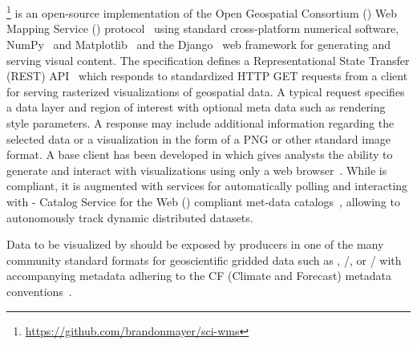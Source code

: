\section{\sciwms{}}
\label{sec:sciwms}
\Sciwms{}\footnote{\url{https://github.com/brandonmayer/sci-wms}} is
an open-source \python{} implementation of the Open Geospatial
Consortium (\ogc{}) Web Mapping Service (\wms{}) protocol~\cite{wms14}
using standard cross-platform numerical software, NumPy~\cite{numpy11}
and Matplotlib~\cite{hunter07} and the Django~\cite{django} web
framework for generating and serving visual content. The \wms{}
specification defines a Representational State Transfer (REST)
API~\cite{Fielding02} which responds to standardized HTTP GET requests
from a \wms{} client for serving rasterized visualizations of
geospatial data. A typical \wms{} request specifies a data layer and
region of interest with optional meta data such as rendering style
parameters. A \wms{} response may include additional information
regarding the selected data or a visualization in the form of a PNG or
other standard image format. A base \wms{} client has been developed
in \javascript{} which gives analysts the ability to generate and
interact with visualizations using only a web browser~\cite{comtui}.
While \sciwms{} is \ogcwms{} compliant, it is augmented with
services for automatically polling and interacting with \ogc{} -
Catalog Service for the Web (\csw{}) compliant met-data
catalogs~\cite{csw14}, allowing \sciwms{} to autonomously track
dynamic distributed datasets.

Data to be visualized by \sciwms{} should be exposed by producers in
one of the many community standard formats for geoscientific gridded
data such as \netcdf{}, \hdf{}/, or \grib{}/ with
accompanying metadata adhering to the CF (Climate and Forecast)
metadata conventions~\cite{cf}.

